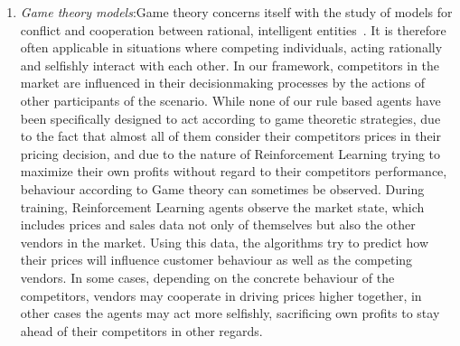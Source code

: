 \begin{enumerate}
	\item \emph{Game theory models}:\label{bullet:GameTheory}Game theory concerns itself with the study of models for conflict and cooperation between rational, intelligent entities~\cite{GameTheory}. It is therefore often applicable in situations where competing individuals, acting rationally and selfishly interact with each other. In our framework, competitors in the market are influenced in their decisionmaking processes by the actions of other participants of the scenario. While none of our rule based agents have been specifically designed to act according to game theoretic strategies, due to the fact that almost all of them consider their competitors prices in their pricing decision, and due to the nature of Reinforcement Learning trying to maximize their own profits without regard to their competitors performance, behaviour according to Game theory can sometimes be observed.  During training, Reinforcement Learning agents observe the market state, which includes prices and sales data not only of themselves but also the other vendors in the market. Using this data, the algorithms try to predict how their prices will influence customer behaviour as well as the competing vendors. In some cases, depending on the concrete behaviour of the competitors, vendors may cooperate in driving prices higher together, in other cases the agents may act more selfishly, sacrificing own profits to stay ahead of their competitors in other regards. 


\end{enumerate}
